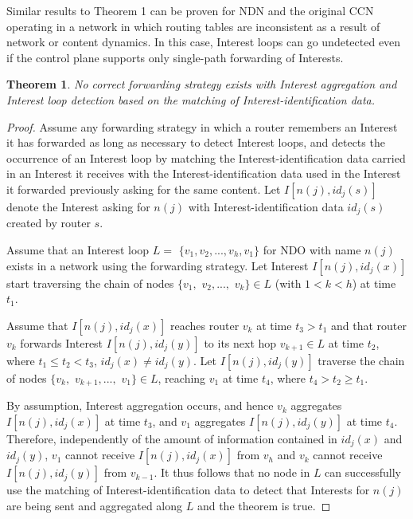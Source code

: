 \documentclass{ancs15-alternate}
\newtheorem{theorem}{Theorem}
\begin{document}
Similar results to Theorem 1 can be proven for NDN and the original CCN  operating in a network  in which routing tables are inconsistent as a result of network or content dynamics.   In this case, Interest loops can go undetected even if the control plane supports only single-path forwarding of Interests. 

\begin{theorem}
\label{theo2}
No correct forwarding strategy exists with Interest aggregation and  Interest loop detection based on the matching of Interest-identification data.
\end{theorem}

\begin{proof}
Assume any  forwarding strategy in which a router remembers an Interest it has forwarded as long as necessary to detect Interest loops, and detects the occurrence of an Interest loop by matching the Interest-identification data carried in an Interest it receives with the Interest-identification data used in the Interest it forwarded previously asking for the same content. Let 
$I[n(j), id_j(s) ]$ denote the Interest asking for $n(j)$ with Interest-identification data  $id_j(s)$ created by router $s$.

Assume that an Interest  loop $L = $   $\{ v_1 , v_2 , ..., v_h , v_1 \}$ for NDO with name $n(j)$ exists in a network using the  forwarding strategy.
Let Interest $I[n(j), id_j(x) ]$ start traversing the chain of nodes  
$\{v_1 ,$  $v_2 , ...,$ $v_k \}  \in L$  (with $1 < k < h$) at time $t_1$.

Assume that $I[n(j), id_j(x) ]$ reaches router $v_k$ at time $t_3 > t_1$ and that router $v_k$ forwards Interest $I[n(j), id_j(y) ]$ to its next hop  $v_{k+1} \in L$ at time $t_2$, where $t_1 \leq t_2 < t_3$,  $id_j(x) \not= id_j(y)$.
Let $I[n(j), id_j(y) ]$ traverse the chain of nodes $\{v_k ,$  $v_{k+1} , ...,$ $v_1 \}  \in L$, reaching $v_1$ at time $t_4 $, where 
$t_4 > t_2 \geq t_1$.

By assumption, Interest aggregation occurs, and hence $v_k$ aggregates $I[n(j), id_j(x) ]$ at time $t_3$, and $v_1$ aggregates $I[n(j), id_j(y) ]$ at time $t_4$.
Therefore, independently of the amount of information contained in $id_j(x)$ and $id_j(y)$,  $v_1$ cannot receive $I[n(j), id_j(x) ]$ from $v_h$ and 
$v_k$ cannot receive  $I[n(j), id_j(y) ]$ from $v_{k-1}$.
It thus follows that no node in $L$ can successfully 
use the matching of Interest-identification data to detect that 
Interests for $n(j)$ are being sent and aggregated along $L$ and the theorem is true.
\end{proof}
\end{document}
